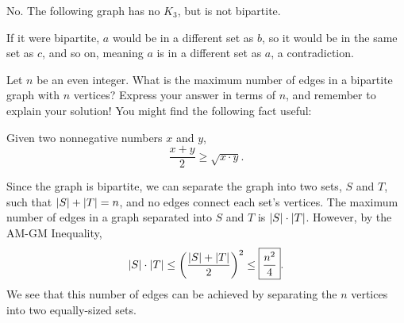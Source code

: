 \documentclass[11pt]{article}
\begin{document}
\begin{solution}
No. The following graph has no $K_3$, but is not bipartite.
\begin{center}
\end{center}
If it were bipartite, $a$ would be in a different set as $b$, so it would be in the same set as $c$, and so on, meaning $a$ is in a different set as $a$, a contradiction.
\end{solution}

\begin{problem} %
Let $n$ be an even integer. What is the maximum number of edges in a bipartite graph with $n$ vertices? Express your answer
in terms of $n$, and remember to explain your solution! You might find the following fact useful:
\begin{theorem}[AM-GM]
\label{thm:am-gm}
Given two nonnegative numbers $x$ and $y$,
\[\frac{x + y}{2} \ge \sqrt{x \cdot y}.\]
\end{theorem}
\end{problem}

\begin{solution}
Since the graph is bipartite, we can separate the graph into two sets, $S$ and $T$, such that $\left\lvert S \right\rvert + \left\lvert T \right\rvert = n$,
and no edges connect each set's vertices. The maximum number of edges in a graph separated into $S$ and $T$ is $\left\lvert S \right\rvert \cdot \left\lvert T \right\rvert$. However, by the
AM-GM Inequality,
\[\left\lvert S \right\rvert \cdot \left\lvert T \right\rvert \le \left(\frac{\left\lvert S \right\rvert + \left\lvert T \right\rvert}{2}\right)^2 \le \boxed{\frac{n^2}{4}}. \]
We see that this number of edges can be achieved by separating the $n$ vertices into two equally-sized sets.
\end{solution}
\end{document}
